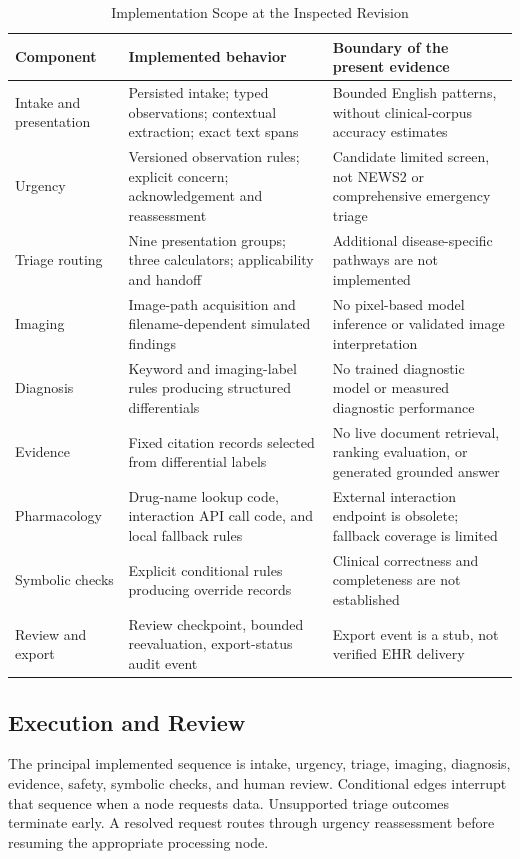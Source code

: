 \documentclass[conference]{IEEEtran}
\begin{document}
\begin{table}[t]
\caption{Implementation Scope at the Inspected Revision}
\label{tab:scope}
\centering\small
\begin{tabularx}{\textwidth}{p{}YY}
\toprule
Component & Implemented behavior & Boundary of the present evidence \\
\midrule
Intake and presentation & Persisted intake; typed observations; contextual extraction; exact text spans & Bounded English patterns, without clinical-corpus accuracy estimates \\
Urgency & Versioned observation rules; explicit concern; acknowledgement and reassessment & Candidate limited screen, not NEWS2 or comprehensive emergency triage \\
Triage routing & Nine presentation groups; three calculators; applicability and handoff & Additional disease-specific pathways are not implemented \\
Imaging & Image-path acquisition and filename-dependent simulated findings & No pixel-based model inference or validated image interpretation \\
Diagnosis & Keyword and imaging-label rules producing structured differentials & No trained diagnostic model or measured diagnostic performance \\
Evidence & Fixed citation records selected from differential labels & No live document retrieval, ranking evaluation, or generated grounded answer \\
Pharmacology & Drug-name lookup code, interaction API call code, and local fallback rules & External interaction endpoint is obsolete; fallback coverage is limited \\
Symbolic checks & Explicit conditional rules producing override records & Clinical correctness and completeness are not established \\
Review and export & Review checkpoint, bounded reevaluation, export-status audit event & Export event is a stub, not verified EHR delivery \\
\bottomrule
\end{tabularx}
\end{table}

\subsection{Execution and Review}
The principal implemented sequence is intake, urgency, triage, imaging, diagnosis, evidence, safety, symbolic checks, and human review. Conditional edges interrupt that sequence when a node requests data. Unsupported triage outcomes terminate early. A resolved request routes through urgency reassessment before resuming the appropriate processing node.
\end{document}
